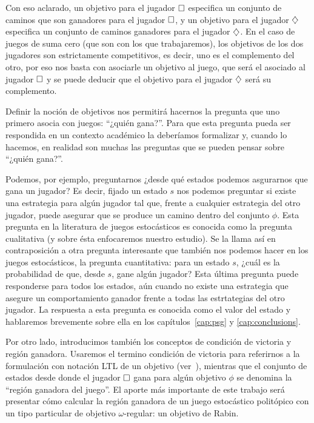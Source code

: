 Con eso aclarado, un objetivo para el jugador $\square$ especifica un conjunto de
caminos que son ganadores para el jugador $\square$, y un objetivo para el
jugador $\diamondsuit$ especifica un conjunto de caminos ganadores para el jugador
$\diamondsuit$. En el caso de juegos de suma cero (que son con los que trabajaremos),
los objetivos de los dos jugadores son estrictamente competitivos, es decir,
uno es el complemento del otro, por eso nos basta con asociarle un objetivo al
juego, que será el asociado al jugador $\square$ y se puede deducir que el
objetivo para el jugador $\diamondsuit$ será su complemento.


Definir la noción de objetivos nos permitirá hacernos la pregunta que uno
primero asocia con juegos: ``¿quién gana?''. Para que esta pregunta pueda ser
respondida en un contexto académico la deberíamos formalizar y, cuando lo
hacemos, en realidad son muchas las preguntas que se pueden pensar sobre
``¿quién gana?''.

Podemos, por ejemplo, preguntarnos ¿desde qué estados podemos asgurarnos que
gana un jugador? Es decir, fijado un estado $s$ nos podemos preguntar si existe
una estrategia para algún jugador tal que, frente a cualquier estrategia del
otro jugador, puede asegurar que se produce un camino dentro del conjunto
$\phi$. Esta pregunta en la literatura de juegos estocásticos es conocida como
la pregunta cualitativa (y sobre ésta enfocaremos nuestro estudio). Se la llama
así en contraposición a otra pregunta interesante que también nos podemos hacer
en los juegos estocásticos, la pregunta cuantitativa: para un estado $s$, ¿cuál
es la probabilidad de que, desde $s$, gane algún jugador? Esta última pregunta
puede responderse para todos los estados, aún cuando no existe una estrategia
que asegure un comportamiento ganador frente a todas las estrtategias del otro
jugador. La respuesta a esta pregunta es conocida como el valor del estado y
hablaremos brevemente sobre ella en los capítulos~\ref{cap:psg} y
\ref{cap:conclusions}.

Por otro lado, introducimos también los conceptos de condición de victoria y
región ganadora. Usaremos el termino condición de victoria para referirnos a la
formulación con notación LTL de un objetivo (ver~\cite{MannaPnueli}), mientras
que el conjunto de estados desde donde el jugador $\square$ gana para algún
objetivo $\phi$ se denomina la ``región ganadora del juego''. El aporte más
importante de este trabajo será presentar cómo calcular la región ganadora de
un juego estocástico politópico con un tipo particular de objetivo
$\omega$-regular: un objetivo de Rabin. %

